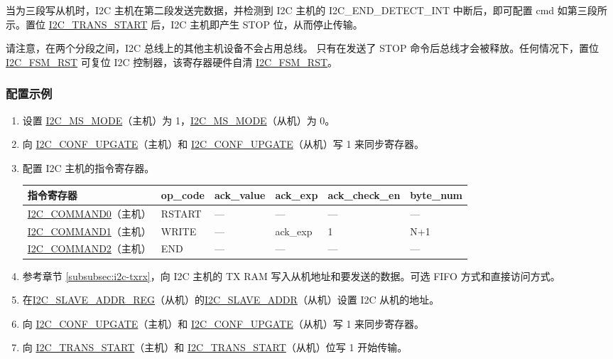 \documentclass[main\_\_CN.tex]{subfiles}
\begin{document}
当为三段写从机时，I2C 主机在第二段发送完数据，并检测到 I2C 主机的 I2C\_END\_DETECT\_INT 中断后，即可配置 cmd 如第三段所示。置位 \hyperref[fielddesc:I2CTRANSSTART]{I2C\_TRANS\_START} 后，I2C 主机即产生 STOP 位，从而停止传输。

请注意，在两个分段之间，I2C 总线上的其他主机设备不会占用总线。 只有在发送了 STOP 命令后总线才会被释放。任何情况下，置位 \hyperref[fielddesc:I2CFSMRST]{I2C\_FSM\_RST} 可复位 I2C 控制器，该寄存器硬件自清 \hyperref[fielddesc:I2CFSMRST]{I2C\_FSM\_RST}。

\subsubsection{配置示例}

\begin{enumerate}
\item 设置 \hyperref[fielddesc:I2CMSMODE]{I2C\_MS\_MODE}（主机）为 1，\hyperref[fielddesc:I2CMSMODE]{I2C\_MS\_MODE}（从机）为 0。
\item 向 \hyperref[fielddesc:I2CCONFUPGATE]{I2C\_CONF\_UPGATE}（主机）和 \hyperref[fielddesc:I2CCONFUPGATE]{I2C\_CONF\_UPGATE}（从机）写 1 来同步寄存器。
\item 配置 I2C 主机的指令寄存器。
\begin{longtable}{ | p{4cm} | p{2cm} | p{2cm} | p{2cm} |p{2cm} | p{2cm} |}
\hline\rowcolor{lightgray}
指令寄存器& op\_code & ack\_value&ack\_exp&ack\_check\_en&byte\_num  \\ \hline
\hyperref[fielddesc:I2CCOMMAND0]{I2C\_COMMAND0}（主机）& RSTART& ---&---&---&---  \\ \hline
\hyperref[fielddesc:I2CCOMMAND1]{I2C\_COMMAND1}（主机）& WRITE& ---&ack\_exp&1&N+1  \\ \hline
\hyperref[fielddesc:I2CCOMMAND2]{I2C\_COMMAND2}（主机）& END& ---&---&---&---  \\ \hline
\end{longtable}
\item 参考章节 \ref{subsubsec:i2c-txrx}，向 I2C 主机的 TX RAM 写入从机地址和要发送的数据。可选 FIFO 方式和直接访问方式。
\item 在\hyperref[regdesc:I2CSLAVEADDRREG]{I2C\_SLAVE\_ADDR\_REG}（从机）的\hyperref[fielddesc:I2CSLAVEADDR]{I2C\_SLAVE\_ADDR}（从机）设置 I2C 从机的地址。
\item 向 \hyperref[fielddesc:I2CCONFUPGATE]{I2C\_CONF\_UPGATE}（主机）和 \hyperref[fielddesc:I2CCONFUPGATE]{I2C\_CONF\_UPGATE}（从机）写 1 来同步寄存器。
\item 向 \hyperref[fielddesc:I2CTRANSSTART]{I2C\_TRANS\_START}（主机）和 \hyperref[fielddesc:I2CTRANSSTART]{I2C\_TRANS\_START}（从机）位写 1 开始传输。

\end{enumerate}
\end{document}
